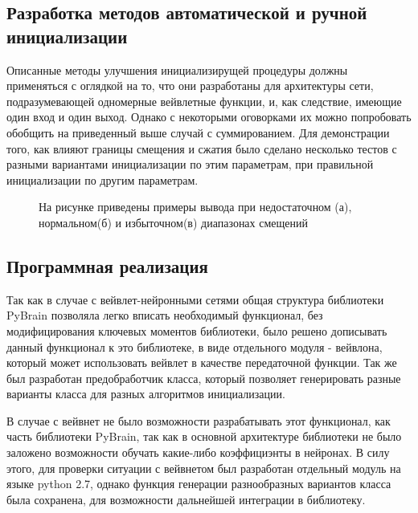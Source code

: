\documentclass[utf8,usehyperref,14pt]{G7-32}
\begin{document}
\subsection{Разработка методов автоматической и ручной инициализации}
Описанные методы улучшения инициализирущей процедуры должны применяться с оглядкой на то, что они разработаны для архитектуры сети, подразумевающей одномерные вейвлетные функции, и, как следствие, имеющие один вход и один выход. Однако с некоторыми оговорками их можно попробовать обобщить на приведенный выше случай с суммированием. Для демонстрации того, как влияют границы смещения и сжатия было сделано несколько тестов с разными вариантами инициализации по этим параметрам, при правильной инициализации по другим параметрам.
\begin{figure}[h]
\begin{minipage}[h]{0.5\linewidth}
\end{minipage}
\hfill
\begin{minipage}[h]{0.5\linewidth}
\end{minipage}
\hfill
\begin{minipage}[h]{0.5\linewidth}
\end{minipage}
\caption{На рисунке приведены примеры вывода при недостаточном (а), нормальном(б) и избыточном(в)  диапазонах смещений }
\label{diapazon_test}
\end{figure}

\subsection{Программная реализация}
Так как в случае с вейвлет-нейронными сетями общая структура библиотеки PyBrain позволяла легко вписать необходимый функционал, без модифицирования ключевых моментов библиотеки, было решено дописывать данный функционал к это библиотеке, в виде отдельного модуля - вейвлона, который может использовать вейвлет в качестве передаточной функции. Так же был разработан предобработчик класса, который позволяет генерировать разные варианты класса для разных алгоритмов инициализации.

В случае с вейвнет не было возможности разрабатывать этот функционал, как часть библиотеки PyBrain, так как в основной архитектуре библиотеки не было заложено возможности обучать какие-либо коэффициэнты в нейронах. В силу этого, для проверки ситуации с вейвнетом был разработан отдельный модуль на языке python 2.7, однако функция генерации разнообразных вариантов класса была сохранена, для возможности дальнейшей интеграции в библиотеку.
\end{document}
